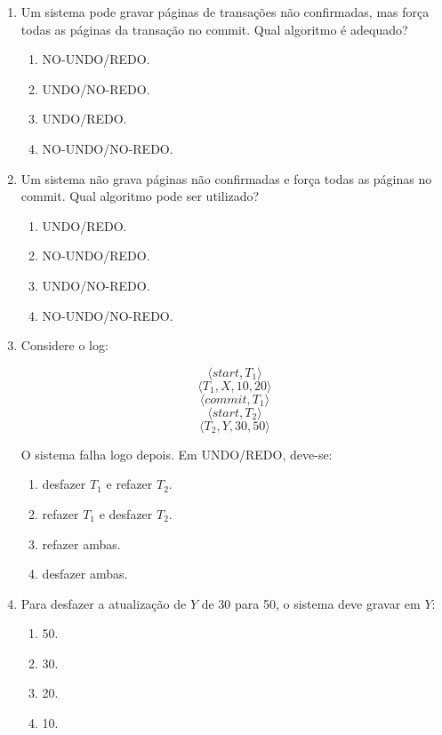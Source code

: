 \documentclass[12pt,a4paper]{article}
\begin{document}
\begin{enumerate}[resume,label=\textbf{Q\arabic*.}]
\item Um sistema pode gravar páginas de transações não confirmadas, mas força todas as páginas da transação no commit. Qual algoritmo é adequado?

\begin{enumerate}[label=\alph*)]
    \item NO-UNDO/REDO.
    \item UNDO/NO-REDO.
    \item UNDO/REDO.
    \item NO-UNDO/NO-REDO.
\end{enumerate}

\item Um sistema não grava páginas não confirmadas e força todas as páginas no commit. Qual algoritmo pode ser utilizado?

\begin{enumerate}[label=\alph*)]
    \item UNDO/REDO.
    \item NO-UNDO/REDO.
    \item UNDO/NO-REDO.
    \item NO-UNDO/NO-REDO.
\end{enumerate}

\item Considere o log:

\[
\langle start,T_1\rangle
\]
\[
\langle T_1,X,10,20\rangle
\]
\[
\langle commit,T_1\rangle
\]
\[
\langle start,T_2\rangle
\]
\[
\langle T_2,Y,30,50\rangle
\]

O sistema falha logo depois. Em UNDO/REDO, deve-se:

\begin{enumerate}[label=\alph*)]
    \item desfazer $T_1$ e refazer $T_2$.
    \item refazer $T_1$ e desfazer $T_2$.
    \item refazer ambas.
    \item desfazer ambas.
\end{enumerate}

\item Para desfazer a atualização de $Y$ de 30 para 50, o sistema deve gravar em $Y$:

\begin{enumerate}[label=\alph*)]
    \item 50.
    \item 30.
    \item 20.
    \item 10.
\end{enumerate}


\end{enumerate}
\end{document}
